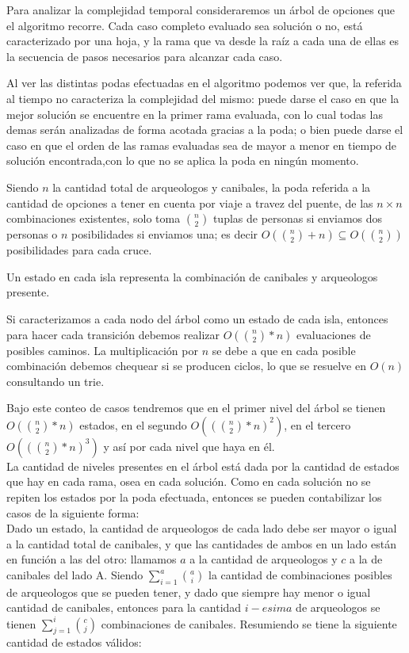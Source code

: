 
Para analizar la complejidad temporal consideraremos un árbol de opciones que el algoritmo recorre. Cada caso completo evaluado sea solución o no, está caracterizado por una hoja, y la rama que va desde la raíz a cada una de ellas es la secuencia de pasos necesarios para alcanzar cada caso.

Al ver las distintas podas efectuadas en el algoritmo podemos ver que, la referida al tiempo no caracteriza la complejidad del mismo: puede darse el caso en que la mejor solución se encuentre en la primer rama evaluada, con lo cual todas las demas serán analizadas de forma acotada gracias a la poda; o bien puede darse el caso en que el orden de las ramas evaluadas sea de mayor a menor en tiempo de soluci\'on encontrada,con lo que no se aplica la poda en ningún momento.

Siendo $n$ la cantidad total de arqueologos y canibales, la poda referida a la cantidad de opciones a tener en cuenta por viaje a travez del puente, de las $n \times n$ combinaciones existentes, solo toma $\binom {n}{2}$ tuplas de personas si enviamos dos personas o $n$ posibilidades si enviamos una; es decir $O(\binom {n}{2} + n) \subseteq O(\binom {n}{2})$ posibilidades para cada cruce.

Un estado en cada isla representa la combinación de canibales y arqueologos presente.

Si caracterizamos a cada nodo del árbol como un estado de cada isla, entonces para hacer cada transición debemos realizar $O(\binom {n}{2} \ast n)$ evaluaciones de posibles caminos. La multiplicación por $n$ se debe a que en cada posible combinación debemos chequear si se producen ciclos, lo que se resuelve en $O(n)$ consultando un trie. 

Bajo este conteo de casos tendremos que en el primer nivel del árbol se tienen $O(\binom {n}{2} \ast n)$ estados, en el segundo $O((\binom {n}{2} \ast n)^2)$, en el tercero $O((\binom {n}{2} \ast n)^3)$ y así por cada nivel que haya en él.\\

La cantidad de niveles presentes en el árbol está dada por la cantidad de estados que hay en cada rama, osea en cada solución. Como en cada solución no se repiten los estados por la poda efectuada, entonces se pueden contabilizar los casos de la siguiente forma:\\

Dado un estado, la cantidad de arqueologos de cada lado debe ser mayor o igual a la cantidad total de canibales, y que las cantidades de ambos en un lado est\'an en función a las del otro: llamamos $a$ a la cantidad de arqueologos y $c$ a la de canibales del lado A. Siendo $\sum_{i=1}^{a}\binom {a}{i}$ la cantidad de combinaciones posibles de arqueologos que se pueden tener, y dado que siempre hay menor o igual cantidad de canibales, entonces para la cantidad  $i-esima$ de arqueologos se tienen $\sum_{j=1}^{i}\binom {c}{j}$ combinaciones de canibales. 
Resumiendo se tiene la siguiente cantidad de estados v\'alidos:

